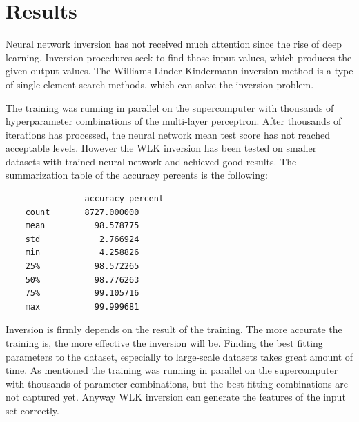 \newpage

\section{Results}

Neural network inversion has not received much attention since the rise of deep learning. Inversion procedures seek to find those input values, which produces the given output values. The Williams-Linder-Kindermann inversion method is a type of single element search methods, which can solve the inversion problem.\medskip

The training was running in parallel on the supercomputer with thousands of hyperparameter combinations of the multi-layer perceptron. After thousands of iterations has processed, the neural network mean test score has not reached acceptable levels. However the WLK inversion has been tested on smaller datasets with trained neural network and achieved good results. The summarization table of the accuracy percents is the following: 
\begin{lstlisting}
        		accuracy_percent
	count       8727.000000
	mean          98.578775
	std            2.766924
	min            4.258826
	25%           98.572265
	50%           98.776263
	75%           99.105716
	max           99.999681
\end{lstlisting}

Inversion is firmly depends on the result of the training. The more accurate the training is, the more effective the inversion will be. Finding the best fitting parameters to the dataset, especially to large-scale datasets takes great amount of time. As mentioned the training was running in parallel on the supercomputer with thousands of parameter combinations, but the best fitting combinations are not captured yet. Anyway WLK inversion can generate the features of the input set correctly. 

